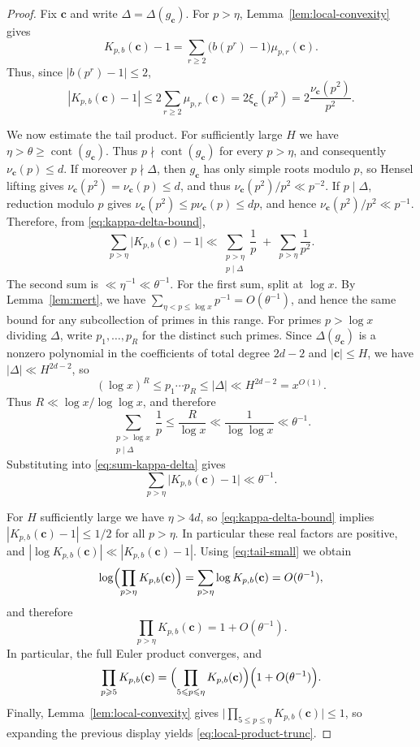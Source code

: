\documentclass[12pt,reqno]{amsart}
\numberwithin{equation}{section}
\theoremstyle{definition}
\renewcommand{\le}{\leqslant}
\renewcommand{\ge}{\geqslant}
\newcommand{\cc}{\mathbf{c}}
\DeclareMathOperator{\cont}{cont}
\begin{document}
\begin{proof}
Fix $\cc$ and write $\Delta=\Delta(g_\cc)$.
For $p>\eta$, Lemma~\ref{lem:local-convexity} gives
\[
K_{p,b}(\cc)-1
=\sum_{r\ge 2}\bigl(b(p^r)-1\bigr)
\mu_{p,r}(\cc).
\]
Thus, since $|b(p^r)-1|\le2$,
\begin{equation}\label{eq:kappa-delta-bound}
|K_{p,b}(\cc)-1|
\le 2\sum_{r\ge 2}\mu_{p,r}(\cc)
=2\xi_\cc(p^2)
=2\frac{\nu_\cc(p^2)}{p^2}.
\end{equation}

We now estimate the tail product.
For sufficiently large $H$ we have $\eta>\theta\ge\cont(g_\cc)$.
Thus $p\nmid\cont(g_\cc)$ for every $p>\eta$, and consequently $\nu_\cc(p)\le d$.
If moreover $p\nmid \Delta$, then $g_\cc$ has only simple roots modulo $p$, so Hensel lifting gives $\nu_\cc(p^2)=\nu_\cc(p)\le d$, and thus $\nu_\cc(p^2)/p^2\ll p^{-2}$.
If $p\mid \Delta$, reduction modulo $p$ gives $\nu_\cc(p^2)\le p\nu_\cc(p)\le dp$, and hence $\nu_\cc(p^2)/p^2\ll p^{-1}$.
Therefore, from \eqref{eq:kappa-delta-bound},
\begin{equation}\label{eq:sum-kappa-delta}
\sum_{p>\eta}\bigl|K_{p,b}(\cc)-1\bigr|
\ll \sum_{\substack{p>\eta\\ p\mid \Delta}}\frac1p \;+\; \sum_{p>\eta}\frac1{p^2}.
\end{equation}
The second sum is $\ll \eta^{-1}\ll \theta^{-1}$.
For the first sum, split at $\log x$.
By Lemma~\ref{lem:mert}, we have $\sum_{\eta<p\le \log x}p^{-1}=O(\theta^{-1})$, and hence the same bound for any subcollection of primes in this range.
For primes $p>\log x$ dividing $\Delta$, write $p_1,\dots,p_R$ for the distinct such primes.
Since $\Delta(g_\cc)$ is a nonzero polynomial in the coefficients of total degree $2d-2$ and $|\cc|\le H$, we have $|\Delta|\ll H^{2d-2}$, so
\[
(\log x)^R \le p_1\cdots p_R \le |\Delta| \ll H^{2d-2}=x^{O(1)}.
\]
Thus $R\ll \log x/\log\log x$, and therefore
\[
\sum_{\substack{p>\log x\\ p\mid \Delta}}\frac1p \le \frac{R}{\log x}\ll \frac1{\log\log x}\ll \theta^{-1}.
\]
Substituting into \eqref{eq:sum-kappa-delta} gives
\begin{equation}\label{eq:tail-small}
\sum_{p>\eta}\bigl|K_{p,b}(\cc)-1\bigr|\ll \theta^{-1}.
\end{equation}

For $H$ sufficiently large we have $\eta>4d$, so \eqref{eq:kappa-delta-bound} implies $|K_{p,b}(\cc)-1|\le 1/2$ for all $p>\eta$.
In particular these real factors are positive, and $|\log K_{p,b}(\cc)|\ll |K_{p,b}(\cc)-1|$.
Using \eqref{eq:tail-small} we obtain
\[
\log\Bigl(\prod_{p>\eta}K_{p,b}(\cc)\Bigr)
=\sum_{p>\eta}\log K_{p,b}(\cc)=O(\theta^{-1}),
\]
and therefore
\[
\prod_{p>\eta}K_{p,b}(\cc)=1+O(\theta^{-1}).
\]
In particular, the full Euler product converges, and
\[
\prod_{p\ge 5}K_{p,b}(\cc)
=\Bigl(\prod_{5\le p\le \eta}K_{p,b}(\cc)\Bigr)
\Bigl(1+O(\theta^{-1})\Bigr).
\]
Finally, Lemma~\ref{lem:local-convexity} gives $\bigl|\prod_{5\le p\le \eta}K_{p,b}(\cc)\bigr|\le1$, so expanding the previous display yields \eqref{eq:local-product-trunc}.
\end{proof}
\end{document}
